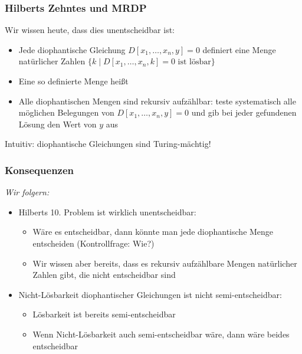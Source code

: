 \documentclass[aspectratio=1610,onlymath]{beamer}
\begin{document}
\begin{frame}\frametitle{Hilberts Zehntes und MRDP}

\pause

Wir wissen heute, dass dies unentscheidbar ist:
\begin{itemize}
\item Jede diophantische Gleichung $D[x_1,\ldots,x_n,y]= 0$ definiert eine Menge natürlicher Zahlen $\{k\mid D[x_1,\ldots,x_n,k]= 0 \text{ ist lösbar}\}$
\item Eine so definierte Menge heißt 
\item Alle diophantischen Mengen sind rekursiv aufzählbar: teste systematisch alle möglichen Belegungen von $D[x_1,\ldots,x_n,y]= 0$ und gib bei jeder gefundenen Lösung den Wert von $y$ aus
\end{itemize}\pause

{\tiny Intuitiv: diophantische Gleichungen sind Turing-mächtig!}

\end{frame}

\begin{frame}\frametitle{Konsequenzen}

\emph{Wir folgern:}
\begin{itemize}
\item \alert{Hilberts 10. Problem ist wirklich unentscheidbar:}
\begin{itemize}
\item Wäre es entscheidbar, dann könnte man jede diophantische Menge entscheiden (Kontrollfrage: Wie?)
\item Wir wissen aber bereits, dass es rekursiv aufzählbare Mengen natürlicher Zahlen gibt, die nicht entscheidbar sind
\end{itemize}\pause
\item \alert{Nicht-Lösbarkeit diophantischer Gleichungen ist nicht semi-entscheidbar:}
\begin{itemize}
\item Lösbarkeit ist bereits semi-entscheidbar
\item Wenn Nicht-Lösbarkeit auch semi-entscheidbar wäre, dann wäre beides entscheidbar
\end{itemize}
\end{itemize}

\end{frame}
\end{document}

